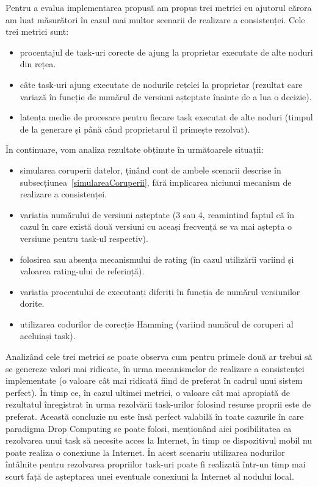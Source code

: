 \documentclass[12pt,a4paper]{report}
\begin{document}
Pentru a evalua implementarea propusă am propus trei metrici cu ajutorul cărora am luat măsurători în cazul mai multor scenarii de realizare a consistenței. Cele trei metrici sunt:
\begin{itemize}
	\item procentajul de task-uri corecte de ajung la proprietar executate de alte noduri din rețea.
	\item câte task-uri ajung executate de nodurile rețelei la proprietar (rezultat care variază în funcție de numărul de versiuni așteptate înainte de a lua o decizie).
	\item latența medie de procesare pentru fiecare task executat de alte noduri (timpul de la generare și până când proprietarul îl primește rezolvat).
\end{itemize}
În continuare, vom analiza rezultate obținute în următoarele situații:
\begin{itemize}
	\item simularea coruperii datelor, ținând cont de ambele scenarii descrise în subsecțiunea~\ref{simulareaCoruperii}, fără implicarea niciunui mecanism de realizare a consistenței.
	\item variația numărului de versiuni așteptate (3 sau 4, reamintind faptul că în cazul în care există două versiuni cu aceași frecvență se va mai aștepta o versiune pentru task-ul respectiv).
	\item folosirea sau absența mecanismului de rating (în cazul utilizării variind și valoarea rating-ului de referință).
	\item variația procentului de executanți diferiți în funcția de numărul versiunilor dorite.
	\item utilizarea codurilor de corecție Hamming (variind numărul de coruperi al aceluiași task).
\end{itemize}

Analizând cele trei metrici se poate observa cum pentru primele două ar trebui să se genereze valori mai ridicate, în urma mecanismelor de realizare a consistenței implementate (o valoare cât mai ridicată fiind de preferat în cadrul unui sistem perfect). În timp ce, în cazul ultimei metrici, o valoare cât mai apropiată de rezultatul înregistrat în urma rezolvării task-urilor folosind resurse proprii este de preferat. Această concluzie nu este însă perfect valabilă în toate cazurile în care paradigma Drop Computing se poate folosi, menționând aici posibilitatea ca rezolvarea unui task să necesite acces la Internet, în timp ce dispozitivul mobil nu poate realiza o conexiune la Internet. În acest scenariu utilizarea nodurilor întâlnite pentru rezolvarea propriilor task-uri poate fi realizată într-un timp mai scurt față de așteptarea unei eventuale conexiuni la Internet al nodului local.
\end{document}
